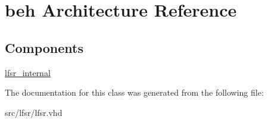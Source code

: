 \hypertarget{classlfsr_1_1beh}{\section{beh Architecture Reference}
\label{classlfsr_1_1beh}
}
\subsection*{Components}
 \begin{DoxyCompactItemize}
\item 
\hypertarget{classlfsr_1_1beh_a6372737c0851c0a5e0070813196d076b}{\hyperlink{classlfsr_1_1beh_a6372737c0851c0a5e0070813196d076b}{lfsr\-\_\-internal}  {\bfseries }  }\label{classlfsr_1_1beh_a6372737c0851c0a5e0070813196d076b}

\end{DoxyCompactItemize}


The documentation for this class was generated from the following file\-:\begin{DoxyCompactItemize}
\item 
src/lfsr/lfsr.\-vhd\end{DoxyCompactItemize}
